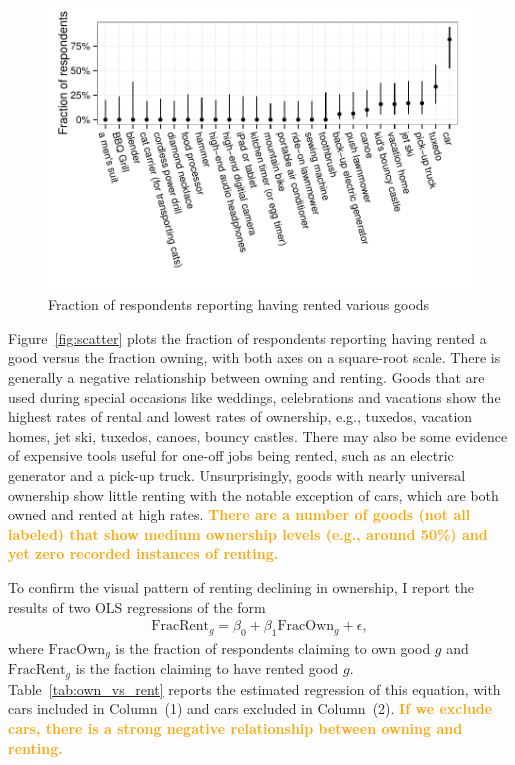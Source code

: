 \documentclass[11pt]{article}
\newcommand{\important}[1]{\textcolor{orange}{\textbf{#1}}}
\newcommand{\important}[1]{#1}
\begin{document}
\begin{figure}
\centering 
\caption{Fraction of respondents reporting having rented various goods \label{fig:frac_renting}}
\begin{minipage}{0.90 \linewidth}
\includegraphics[width = \linewidth]{./plots/rental_fractions.pdf} 
\end{minipage} 
\end{figure} 

Figure~\ref{fig:scatter} plots the fraction of respondents reporting having rented a good versus the fraction owning, with both axes on a square-root scale.  
There is generally a negative relationship between owning and renting. 
Goods that are used during special occasions like weddings, celebrations and vacations show the highest rates of rental and lowest rates of ownership, e.g., tuxedos, vacation homes, jet ski, tuxedos, canoes, bouncy castles. 
There may also be some evidence of expensive tools useful for one-off jobs being rented, such as an electric generator and a pick-up truck. 
Unsurprisingly, goods with nearly universal ownership show little renting with the notable exception of cars, which are both owned and rented at high rates.  
\important{There are a number of goods (not all labeled) that show medium ownership levels (e.g., around 50\%) and yet zero recorded instances of renting.} 

To confirm the visual pattern of renting declining in ownership, I report the results of two OLS regressions of the form
\begin{align}
\mbox{FracRent}_g = \beta_0 + \beta_1 \mbox{FracOwn}_g + \epsilon,  
\end{align} 
where $\mbox{FracOwn}_g$ is the fraction of respondents claiming to own good $g$ and $\mbox{FracRent}_g$ is the faction claiming to have rented good $g$. 
Table~\ref{tab:own_vs_rent} reports the estimated regression of this equation, with cars included in Column~(1) and cars excluded in Column~(2). 
\important{If we exclude cars, there is a strong negative relationship between owning and renting.}
\end{document}
